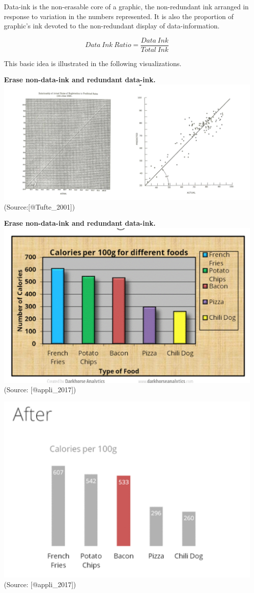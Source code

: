 \documentclass[]{book}
\theoremstyle{definition}
\theoremstyle{definition}
\theoremstyle{definition}
\theoremstyle{remark}
\begin{document}
Data-ink is the non-erasable core of a graphic, the non-redundant ink
arranged in response to variation in the numbers represented. It is also
the proportion of graphic's ink devoted to the non-redundant display of
data-information.

\[{Data \ Ink \ Ratio} = \frac{{Data \ Ink}}{{Total \ Ink}}\]

This basic idea is illustrated in the following visualizations.

\textbf{Erase non-data-ink and redundant data-ink.}
\includegraphics{images/Tufte_figure1.png} (Source:{[}@Tufte\_2001{]})

\textbf{Erase non-data-ink and redundant data-ink.}
\includegraphics{images/Tufte_figure2.png} (Source: {[}@appli\_2017{]})

\includegraphics{images/Tufte_figure3.png} (Source: {[}@appli\_2017{]})
\end{document}
